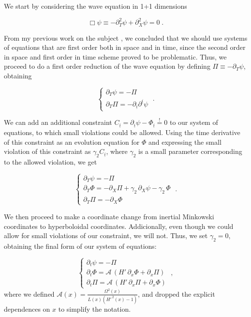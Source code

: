 We start by considering the wave equation in 1+1 dimensions

\begin{equation}
    \Box \psi \equiv - \partial_T^2 \psi + \partial_X^2  \psi = 0 \;.
\end{equation}

From my previous work on the subject \cite{}, we concluded that we should use systems of equations that are first order both in space and in time, since the second order in space and first order in time scheme proved to be problematic. Thus, we proceed to do a first order reduction of the wave equation by defining $\Pi \equiv -\partial_T \psi$, obtaining

\begin{equation}
    \left\{ \begin{array}{l} 
        \partial_T \psi = - \Pi \\ 
        \partial_T \Pi = -\partial_{\underline{i}} \partial^{\underline{i}} \psi 
    \end{array} \right. \; .
\end{equation}

We can add an additional constraint $C_{\underline{i}} = \partial_{\underline{i}} \psi - \Phi_{\underline{i}} \overset{!}{=} 0$ to our system of equations, to which small violations could be allowed. Using the time derivative of this constraint as an evolution equation for $\Phi$ and expressing the small violation of this constraint as $\gamma_2 C_{\underline{i}}$, where $\gamma_2$ is a small parameter corresponding to the allowed violation, we get

\begin{equation}
    \left\{ \begin{array}{l} 
        \partial_T \psi = - \Pi \\ 
        \partial_T \Phi = - \partial_X \Pi + \gamma_2 \, \partial_X \psi - \gamma_2 \, \Phi\\
        \partial_T \Pi = -\partial_X \Phi
    \end{array} \right. \; .
\end{equation}

We then proceed to make a coordinate change from inertial Minkowski coordinates to hyperboloidal coordinates. Addicionally, even though we could allow for small violations of our constraint, we will not. Thus, we set $\gamma_2 = 0$, obtaining the final form of our system of equations:

\begin{equation}
    \left\{ \begin{array}{l} 
        \partial_t \psi = - \Pi \\ 
        \partial_t \Phi = \mathcal{A} \, \left( H' \, \partial_x \Phi + \partial_x \Pi \right)\\
        \partial_t \Pi = \mathcal{A} \, \left( H' \, \partial_x \Pi + \partial_x \Phi \right)
    \end{array} \right. \; ,
\end{equation}
where we defined $\mathcal{A}(x) =\frac{\Omega^2(x)}{L(x)(H'^{\,2}(x)-1)}$, and dropped the explicit dependences on $x$ to simplify the notation.

